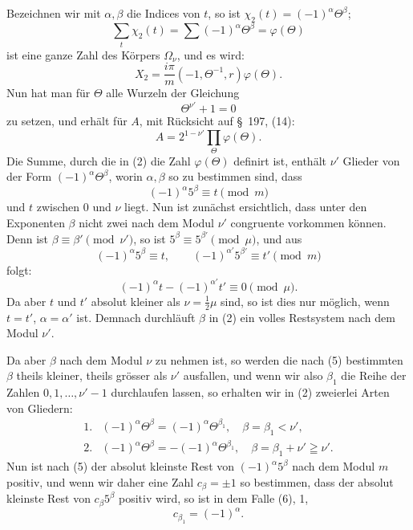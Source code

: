 \documentclass[11pt]{article}
\begin{document}
Bezeichnen wir mit $\alpha,\beta$ die Indices von $t$, so ist $\chi_2(t)=(-1)^\alpha\Theta^\beta$;
\begin{equation}
\sum_t\chi_2(t)=\sum(-1)^\alpha\Theta^\beta=\varphi(\Theta)
\tag{2}
\end{equation}
ist eine ganze Zahl des Körpers $\Omega_\nu$, und es wird:
\[
X_2=\frac{i\pi}{m}(-1,\Theta^{-1},r)\varphi(\Theta).
\]
Nun hat man für $\Theta$ alle Wurzeln der Gleichung
\begin{equation}
\Theta^{\nu'}+1=0
\tag{3}
\end{equation}
zu setzen, und erhält für $A$, mit Rücksicht auf \S~197, (14):
\begin{equation}
A=2^{1-\nu'}\prod_\Theta\varphi(\Theta).
\tag{4}
\end{equation}
Die Summe, durch die in (2) die Zahl $\varphi(\Theta)$ definirt ist, enthält $\nu'$ Glieder von der Form $(-1)^\alpha\Theta^\beta$, worin $\alpha,\beta$ so zu bestimmen sind, dass
\begin{equation}
(-1)^\alpha5^\beta\equiv t\pmod m
\tag{5}
\end{equation}
und $t$ zwischen 0 und $\nu$ liegt. Nun ist zunächst ersichtlich, dass unter den Exponenten $\beta$ nicht zwei nach dem Modul $\nu'$ congruente vorkommen können. Denn ist $\beta\equiv\beta'\pmod{\nu'}$, so ist $5^\beta\equiv5^{\beta'}\pmod\mu$, und aus
\[
(-1)^\alpha5^\beta\equiv t,
\qquad
(-1)^{\alpha'}5^{\beta'}\equiv t'\pmod m
\]
folgt:
\[
(-1)^\alpha t-(-1)^{\alpha'}t'\equiv0\pmod\mu.
\]
Da aber $t$ und $t'$ absolut kleiner als $\nu=\frac12\mu$ sind, so ist dies nur möglich, wenn $t=t'$, $\alpha=\alpha'$ ist. Demnach durchläuft $\beta$ in (2) ein volles Restsystem nach dem Modul $\nu'$.

Da aber $\beta$ nach dem Modul $\nu$ zu nehmen ist, so werden die nach (5) bestimmten $\beta$ theils kleiner, theils grösser als $\nu'$ ausfallen, und wenn wir also $\beta_1$ die Reihe der Zahlen $0,1,\ldots,\nu'-1$ durchlaufen lassen, so erhalten wir in (2) zweierlei Arten von Gliedern:
\begin{equation}
\begin{array}{ll}
1. & (-1)^\alpha\Theta^\beta=(-1)^\alpha\Theta^{\beta_1},\quad \beta=\beta_1<\nu',\\[1mm]
2. & (-1)^\alpha\Theta^\beta=-(-1)^\alpha\Theta^{\beta_1},\quad \beta=\beta_1+\nu'\geqq\nu'.
\end{array}
\tag{6}
\end{equation}
Nun ist nach (5) der absolut kleinste Rest von $(-1)^\alpha5^\beta$ nach dem Modul $m$ positiv, und wenn wir daher eine Zahl $c_\beta=\pm1$ so bestimmen, dass der absolut kleinste Rest von $c_\beta5^\beta$ positiv wird, so ist in dem Falle (6), 1,
\[
c_{\beta_1}=(-1)^\alpha.
\]
\end{document}
